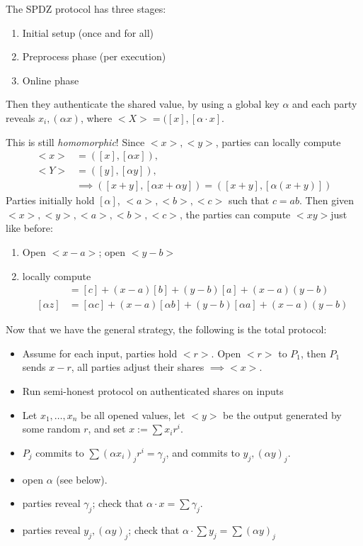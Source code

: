 \begin{prcl}[SPDZ]
The SPDZ protocol has three stages: 
\begin{enumerate}
\item Initial setup (once and for all)
\item Preprocess phase (per execution)
\item Online phase
\end{enumerate}
Then they authenticate the shared value, by using a global key $\alpha$ and each party reveals $x_i, (\alpha x)$, where
$<X> = ([x], [\alpha \cdot x]$.

This is still \textit{homomorphic}! Since $<x>, <y>$, parties can locally compute 
\begin{align*}
    <x> &= ([x], [\alpha x]), \\
    <Y> &= ([y], [\alpha y]), \\
    &\implies ([x + y], [\alpha x + \alpha y]) = ([x + y], [\alpha(x + y)])
\end{align*}
Parties initially hold $[\alpha]$, $<a>, <b>, <c>$ such that $c = a b$.
Then given $<x>, <y>, <a>, <b>, <c>$, the parties can compute $<x y>$just like before:
\begin{enumerate}
\item Open $<x - a>$; open $<y - b>$
\item locally compute
\begin{align*}
    [z] &= [c] + (x - a)[b] + (y - b)[a] + (x - a)(y - b) \\
    [\alpha z] &= [\alpha c] + (x - a)[\alpha b] + (y - b)[\alpha a] + (x - a)(y - b)
\end{align*}
\end{enumerate}
Now that we have the general strategy, the following is the total protocol:
\begin{itemize}
\item 
Assume for each input, parties hold $<r>$.
Open $<r>$ to $P_1$, then $P_1$ sends $x - r$,
all parties adjust their shares $\implies <x>$.
\item 
Run semi-honest protocol on authenticated shares on inputs
\item 
Let $x_1, \dots, x_n$ be all opened values,
let $<y>$ be the output generated by some random $r$, and 
set $x := \sum x_i r^i$.
\item 
$P_j$ commits to $\sum (\alpha x_i)_j r^i = \gamma_j$, 
and commits to $y_j, (\alpha y)_j$.
\item 
open $\alpha$ (see below).
\item 
parties reveal $\gamma_j$; 
check that $\alpha \cdot x = \sum \gamma_j$.
\item 
parties reveal $y_j, (\alpha y)_j$;
check that $\alpha \cdot \sum y_j = \sum (\alpha y)_j$
\end{itemize}
\end{prcl}

